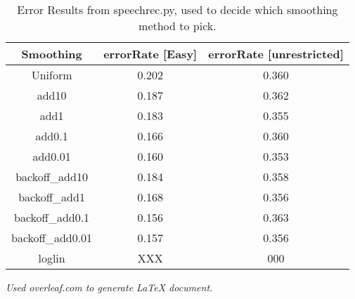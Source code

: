 \documentclass[12pt, letterpaper]{article}
\begin{document}
\begin{table}
\begin{center}
\begin{tabular}{|c|c|c|}
\hline
Smoothing & errorRate [Easy] & errorRate [unrestricted]\\
\hline \hline
Uniform & 0.202 & 0.360\\
\hline 
add10 & 0.187 & 0.362\\
\hline 
add1 & 0.183 & 0.355\\
\hline 
add0.1 & 0.166 & 0.360\\
\hline 
add0.01 & 0.160 & 0.353\\
\hline 
backoff\_add10 & 0.184 & 0.358\\
\hline 
backoff\_add1 & 0.168 & 0.356\\
\hline 
backoff\_add0.1 & 0.156 & 0.363\\
\hline 
backoff\_add0.01 & 0.157 & 0.356\\
\hline 
loglin & XXX & 000\\
\hline
\end{tabular}
\end{center}
\caption{Error Results from speechrec.py, used to decide which smoothing method to pick.}
\label{tableOne}
\end{table}

\begin{center}
\textit{Used overleaf.com to generate LaTeX document.}
\end{center}
\end{document}
